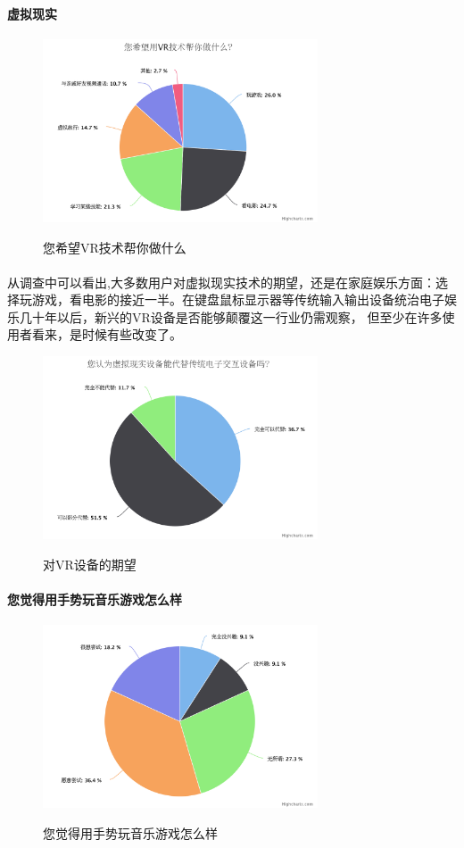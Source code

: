 \documentclass{article}
\begin{document}
\paragraph{虚拟现实}
\begin{figure}[H]
  \centering
  \includegraphics[width=22em]{chart.png}\\
  \caption{您希望VR技术帮你做什么}\label{2-3}
\end{figure}
\paragraph{}
从调查中可以看出,大多数用户对虚拟现实技术的期望，还是在家庭娱乐方面：选择玩游戏，看电影的接近一半。在键盘鼠标显示器等传统输入输出设备统治电子娱乐几十年以后，新兴的VR设备是否能够颠覆这一行业仍需观察，
但至少在许多使用者看来，是时候有些改变了。
\begin{figure}[H]
  \centering
  \includegraphics[width=22em]{chart6.png}\\
  \caption{对VR设备的期望}\label{2-4}
\end{figure}
\newpage
\paragraph{您觉得用手势玩音乐游戏怎么样}
\begin{figure}[H]
  \centering
  \includegraphics[width=22em]{chart5.png}\\
  \caption{您觉得用手势玩音乐游戏怎么样}\label{2-5}
\end{figure}
\end{document}
